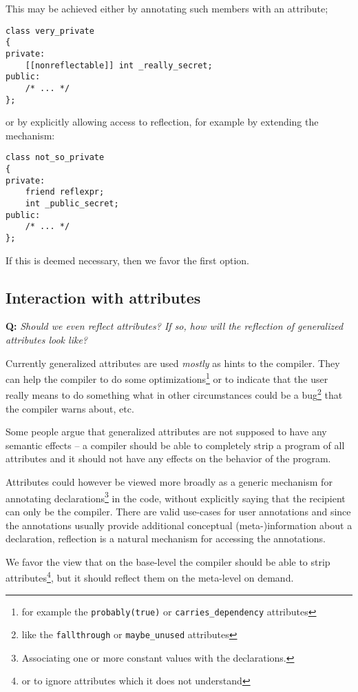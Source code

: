 This may be achieved either by annotating such members with an attribute;

\begin{verbatim}
class very_private
{
private:
	[[nonreflectable]] int _really_secret;
public:
	/* ... */
};
\end{verbatim}

or by explicitly allowing access to reflection, for example by extending
the \verb@friend@ mechanism:

\begin{verbatim}
class not_so_private
{
private:
	friend reflexpr;
	int _public_secret;
public:
	/* ... */
};
\end{verbatim}

If this is deemed necessary, then we favor the first option.

\subsection{Interaction with attributes}

\textbf{Q:} {\em Should we even reflect attributes? If so, how will the reflection
of generalized attributes look like?}

Currently generalized attributes are used {\em mostly} as hints to the compiler.
They can help the compiler to do some optimizations\footnote{for example the
\texttt{probably(true)} or \texttt{carries\_dependency} attributes} or to
indicate that the user really means to do something what in other circumstances
could be a bug\footnote{like the \texttt{fallthrough} or \texttt{maybe\_unused}
attributes} that the compiler warns about, etc.

Some people argue that generalized attributes are not supposed to have any
semantic effects -- a compiler should be able to completely strip 
a program of all attributes and it should not have any effects on the behavior
of the program.

Attributes could however be viewed more broadly as a generic mechanism for
annotating declarations\footnote{Associating one or more constant values with
the declarations.} in the code, without explicitly saying that the recipient
can only be the compiler.
There are valid use-cases for user annotations and since the annotations
usually provide additional conceptual (meta-)information about a declaration,
reflection is a natural mechanism for accessing the annotations.

We favor the view that on the base-level the compiler should be able to
strip attributes\footnote{or to ignore attributes which it does not understand},
but it should reflect them on the meta-level on demand.

